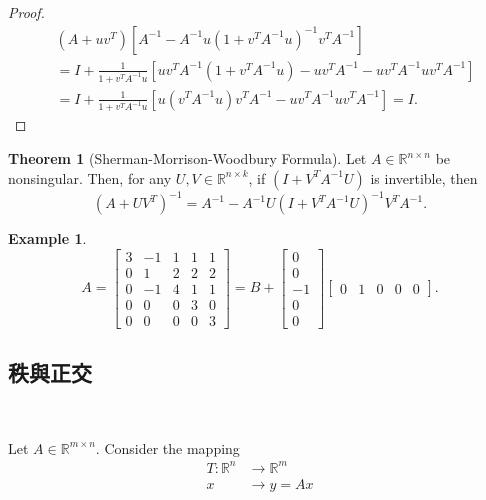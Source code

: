 \documentclass{article}
\theoremstyle{definition}
\newtheorem{theorem}{Theorem}[section]
\newtheorem{example}{Example}[section]
\numberwithin{theorem}{section}
\numberwithin{equation}{section}
\begin{document}
\begin{proof}
    \begin{align*}
        &(A + uv^T) [A^{-1} - A^{-1} u (1 + v^T A^{-1} u)^{-1} v^T A^{-1}] \\
        &= I + \frac{1}{1 + v^T A^{-1} u} [uv^T A^{-1} (1 + v^T A^{-1} u) - uv^T A^{-1} - uv^T A^{-1} uv^T A^{-1}] \\
        &= I + \frac{1}{1 + v^T A^{-1} u} [u (v^T A^{-1} u) v^T A^{-1} - uv^T A^{-1} uv^T A^{-1}] = I.
    \end{align*}
\end{proof}

\begin{theorem}[Sherman-Morrison-Woodbury Formula]
    Let $A \in \mathbb{R}^{n \times n}$ be nonsingular. Then, for any $U, V \in \mathbb{R}^{n \times k}$, if $(I + V^T A^{-1} U)$ is invertible, then
\[
(A + UV^T)^{-1} = A^{-1} - A^{-1} U (I + V^T A^{-1} U)^{-1} V^T A^{-1}.
\]
\end{theorem}

\begin{example}
\[
A = \begin{bmatrix}        3 & -1 & 1 & 1 & 1 \\        0 & 1 & 2 & 2 & 2 \\        0 & -1 & 4 & 1 & 1 \\        0 & 0 & 0 & 3 & 0 \\        0 & 0 & 0 & 0 & 3        \end{bmatrix} = B + \begin{bmatrix}        0 \\        0 \\        -1 \\        0 \\        0        \end{bmatrix} \begin{bmatrix}        0 & 1 & 0 & 0 & 0        \end{bmatrix}.
\]
\end{example}

\subsection{秩與正交}  

Let $A \in \mathbb{R}^{m \times n}$. Consider the mapping
\begin{align*}
T: \mathbb{R}^n &\to \mathbb{R}^m \\ 
x &\to y=Ax 
\end{align*}
\end{document}
